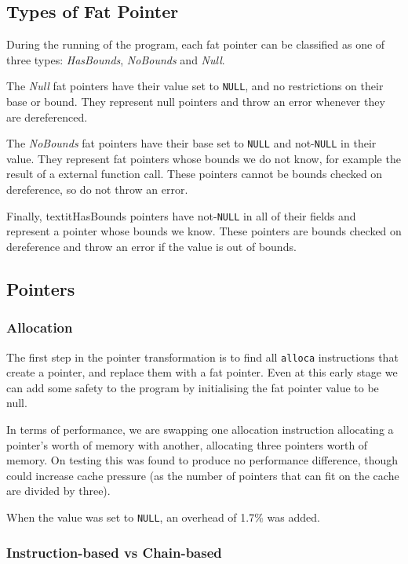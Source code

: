 \subsection{Types of Fat Pointer}

During the running of the program, each fat pointer can be classified as one of three types: \textit{HasBounds}, \textit{NoBounds} and \textit{Null}.

The \textit{Null} fat pointers have their value set to \verb!NULL!, and no restrictions on their base or bound.
They represent null pointers and throw an error whenever they are dereferenced.

The \textit{NoBounds} fat pointers have their base set to \verb!NULL! and not-\verb!NULL! in their value.
They represent fat pointers whose bounds we do not know, for example the result of a external function call.
These pointers cannot be bounds checked on dereference, so do not throw an error.

Finally, textit{HasBounds} pointers have not-\verb!NULL! in all of their fields and represent a pointer whose bounds we know.
These pointers are bounds checked on dereference and throw an error if the value is out of bounds.

\subsection{Pointers}

\subsubsection{Allocation}

The first step in the pointer transformation is to find all \verb!alloca! instructions that create a pointer, and replace them with a fat pointer.
Even at this early stage we can add some safety to the program by initialising the fat pointer value to be null.

In terms of performance, we are swapping one allocation instruction allocating a pointer's worth of memory with another, allocating three pointers worth of memory. 
On testing this was found to produce no performance difference, though could increase cache pressure (as the number of pointers that can fit on the cache are divided by three).

When the value was set to \verb!NULL!, an overhead of 1.7\% was added.

\subsubsection{Instruction-based vs Chain-based}

